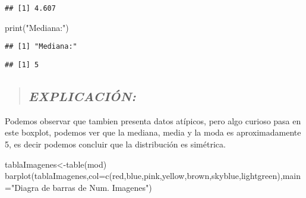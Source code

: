 \documentclass[
]{article}
\newenvironment{Shaded}{\begin{snugshade}}{\end{snugshade}}
\newcommand{\AttributeTok}[1]{\textcolor[rgb]{0.77,0.63,0.00}{#1}}
\newcommand{\FunctionTok}[1]{\textcolor[rgb]{0.00,0.00,0.00}{#1}}
\newcommand{\NormalTok}[1]{#1}
\newcommand{\OtherTok}[1]{\textcolor[rgb]{0.56,0.35,0.01}{#1}}
\newcommand{\SpecialCharTok}[1]{\textcolor[rgb]{0.00,0.00,0.00}{#1}}
\newcommand{\StringTok}[1]{\textcolor[rgb]{0.31,0.60,0.02}{#1}}
\begin{document}
\begin{Shaded}
\end{Shaded}

\begin{verbatim}
## [1] 4.607
\end{verbatim}

\begin{Shaded}
\begin{Highlighting}[]
\FunctionTok{print}\NormalTok{(}\StringTok{"Mediana:"}\NormalTok{)}
\end{Highlighting}
\end{Shaded}

\begin{verbatim}
## [1] "Mediana:"
\end{verbatim}

\begin{Shaded}
\end{Shaded}

\begin{verbatim}
## [1] 5
\end{verbatim}

\begin{quote}
\hypertarget{explicaciuxf3n-6}{%
\subsection{\texorpdfstring{\textbf{\emph{EXPLICACIÓN:}}}{EXPLICACIÓN:}}\label{explicaciuxf3n-6}}
\end{quote}

Podemos observar que tambien presenta datos atípicos, pero algo curioso
pasa en este boxplot, podemos ver que la mediana, media y la moda es
aproximadamente 5, es decir podemos concluir que la distribución es
simétrica.

\begin{Shaded}
\begin{Highlighting}[]
\NormalTok{tablaImagenes}\OtherTok{\textless{}{-}}\FunctionTok{table}\NormalTok{(mod)}
\FunctionTok{barplot}\NormalTok{(tablaImagenes,}\AttributeTok{col=}\FunctionTok{c}\NormalTok{(}\StringTok{\textquotesingle{}red\textquotesingle{}}\NormalTok{,}\StringTok{\textquotesingle{}blue\textquotesingle{}}\NormalTok{,}\StringTok{\textquotesingle{}pink\textquotesingle{}}\NormalTok{,}\StringTok{\textquotesingle{}yellow\textquotesingle{}}\NormalTok{,}\StringTok{\textquotesingle{}brown\textquotesingle{}}\NormalTok{,}\StringTok{\textquotesingle{}skyblue\textquotesingle{}}\NormalTok{,}\StringTok{\textquotesingle{}lightgreen\textquotesingle{}}\NormalTok{),}\AttributeTok{main=}\StringTok{"Diagra de barras de Num. Imagenes"}\NormalTok{)}
\end{Highlighting}
\end{Shaded}
\end{document}
